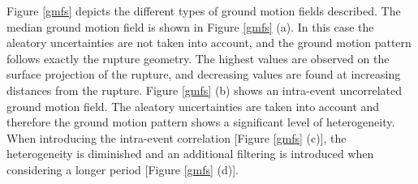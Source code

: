 Figure \ref{gmfs} depicts the different types of ground motion fields described. The median ground motion field is shown in Figure \ref{gmfs} (a). In this case the aleatory uncertainties are not taken into account, and the ground motion pattern follows exactly the rupture geometry. The highest values are observed on the surface projection of the rupture, and decreasing values are found at increasing distances from the rupture. Figure \ref{gmfs} (b) shows an intra-event uncorrelated ground motion field. The aleatory uncertainties are taken into account and therefore the ground motion pattern shows a significant level of heterogeneity. When introducing the intra-event correlation [Figure \ref{gmfs} (c)], the heterogeneity is diminished and an additional filtering is introduced when considering a longer period [Figure \ref{gmfs} (d)].\\
